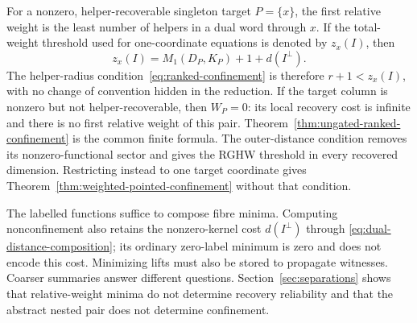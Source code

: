 For a nonzero, helper-recoverable singleton target $P=\{x\}$, the first relative weight is
the least number of helpers in a dual word through $x$.  If the total-weight
threshold used for one-coordinate equations is denoted by $z_x(I)$, then
\begin{equation}
 z_x(I)=M_1(D_P,K_P)+1+d(I^\perp).
 \label{eq:singleton-threshold}
\end{equation}
The helper-radius condition~\eqref{eq:ranked-confinement} is therefore
$r+1<z_x(I)$, with no change of convention hidden in the reduction.
If the target column is nonzero but not helper-recoverable, then $W_P=0$:
its local recovery cost is infinite and there is no first relative weight
of this pair.
Theorem~\ref{thm:ungated-ranked-confinement} is the common finite formula.
The outer-distance condition removes its nonzero-functional sector and gives the
RGHW threshold in every recovered dimension.  Restricting instead to one
target coordinate gives Theorem~\ref{thm:weighted-pointed-confinement} without
that condition.

The labelled functions suffice to compose fibre minima.  Computing
nonconfinement also retains the nonzero-kernel cost $d(I^\perp)$ through
\eqref{eq:dual-distance-composition}; its ordinary zero-label minimum is
zero and does not encode this cost.  Minimizing lifts must also be stored
to propagate witnesses.  Coarser summaries answer different questions.
Section~\ref{sec:separations} shows that
relative-weight minima do not determine recovery reliability and that the
abstract nested pair does not determine confinement.
